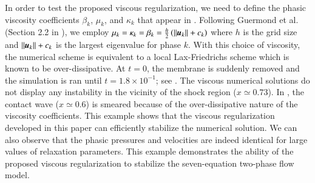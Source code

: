 \documentclass[preprint,10pt]{elsarticle}
\begin{document}
In order to test the proposed viscous regularization, we need to define the phasic viscosity coefficients $\beta_k$, $\mu_k$, and $\kappa_k$ that appear in . 
Following Guermond et al. (Section 2.2 in \cite{jlg}), we employ $\mu_k =  \kappa_k = \beta_k = \tfrac{h}{2} \left( ||\boldsymbol u_k|| + c_k \right)$ where $h$ is the grid size and $||\boldsymbol u_k|| + c_k$ is the 
largest eigenvalue for phase $k$. With this choice of viscosity, the numerical scheme is equivalent to a local Lax-Friedrichs scheme which is known to be over-dissipative.
At $t=0$, the membrane is suddenly removed and the simulation is ran until $t=1.8\times 10^{-1}$; see .
The viscous numerical solutions do not display any instability in the vicinity of the shock region ($x \simeq 0.73$). In , the contact wave ($x \simeq 0.6$) is smeared 
because of the over-dissipative nature of the viscosity coefficients. This example shows that the viscous regularization developed in this paper can efficiently stabilize the numerical solution.
We can also observe that the phasic pressures and velocities are indeed identical for large values of relaxation parameters.
This example demonstrates the ability of the proposed viscous regularization to stabilize the seven-equation two-phase flow model.
%
\end{document}
